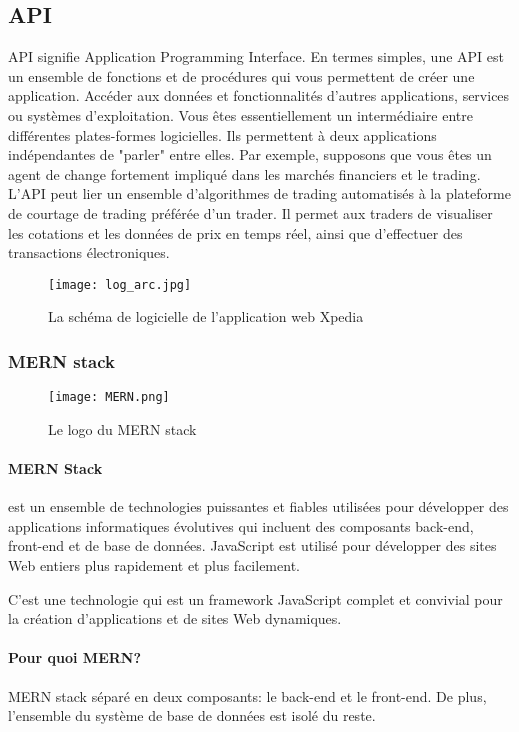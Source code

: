     \subsection{API}
    API signifie Application Programming Interface. En termes simples, une API est un ensemble de fonctions et de procédures qui vous permettent de créer une application. Accéder aux données et fonctionnalités d'autres applications, services ou systèmes d'exploitation. 
    Vous êtes essentiellement un intermédiaire entre différentes plates-formes logicielles. Ils permettent à deux applications indépendantes de "parler" entre elles. 
    Par exemple, supposons que vous êtes un agent de change fortement impliqué dans les marchés financiers et le trading. L'API peut lier un ensemble d'algorithmes de trading automatisés à la plateforme de courtage de trading préférée d'un trader. Il permet aux traders de visualiser les cotations et les données de prix en temps réel, ainsi que d'effectuer des transactions électroniques.

    \begin{figure}[H]
        \centering
        \texttt{[image: log\_arc.jpg]}
        \caption{La schéma de logicielle de l'application web Xpedia}\label{fig:log_arc}
    \end{figure}

    \subsubsection{MERN stack}
    \begin{figure}[H]
        \centering
        \texttt{[image: MERN.png]}
        \caption{Le logo du MERN stack}\label{fig:mern}
    \end{figure}
    \paragraph{MERN Stack} est un ensemble de technologies puissantes et fiables utilisées pour développer des applications informatiques évolutives qui incluent des composants back-end, front-end et de base de données. JavaScript est utilisé pour développer des sites Web entiers plus rapidement et plus facilement.

    C'est une technologie qui est un framework JavaScript complet et convivial pour la création d'applications et de sites Web dynamiques.

    \paragraph{Pour quoi MERN?}MERN stack séparé en deux composants: le back-end et le front-end. De plus, l'ensemble du système de base de données est isolé du reste.

